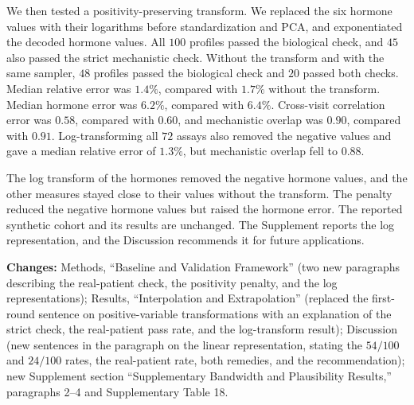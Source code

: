 \documentclass[
  11pt,
  letterpaper,
]{article}
\begin{document}
We then tested a positivity-preserving transform. We replaced the six
hormone values with their logarithms before standardization and PCA, and
exponentiated the decoded hormone values. All \(100\) profiles passed
the biological check, and \(45\) also passed the strict mechanistic
check. Without the transform and with the same sampler, \(48\) profiles
passed the biological check and \(20\) passed both checks. Median
relative error was \(1.4\%\), compared with \(1.7\%\) without the
transform. Median hormone error was \(6.2\%\), compared with \(6.4\%\).
Cross-visit correlation error was \(0.58\), compared with \(0.60\), and
mechanistic overlap was \(0.90\), compared with \(0.91\).
Log-transforming all \(72\) assays also removed the negative values and
gave a median relative error of \(1.3\%\), but mechanistic overlap fell
to \(0.88\).

The log transform of the hormones removed the negative hormone values,
and the other measures stayed close to their values without the
transform. The penalty reduced the negative hormone values but raised
the hormone error. The reported synthetic cohort and its results are
unchanged. The Supplement reports the log representation, and the
Discussion recommends it for future applications.

\textbf{Changes:} Methods, ``Baseline and Validation Framework'' (two
new paragraphs describing the real-patient check, the positivity
penalty, and the log representations); Results, ``Interpolation and
Extrapolation'' (replaced the first-round sentence on positive-variable
transformations with an explanation of the strict check, the
real-patient pass rate, and the log-transform result); Discussion (new
sentences in the paragraph on the linear representation, stating the
\(54/100\) and \(24/100\) rates, the real-patient rate, both remedies,
and the recommendation); new Supplement section ``Supplementary
Bandwidth and Plausibility Results,'' paragraphs 2--4 and Supplementary
Table 18.
\end{document}
